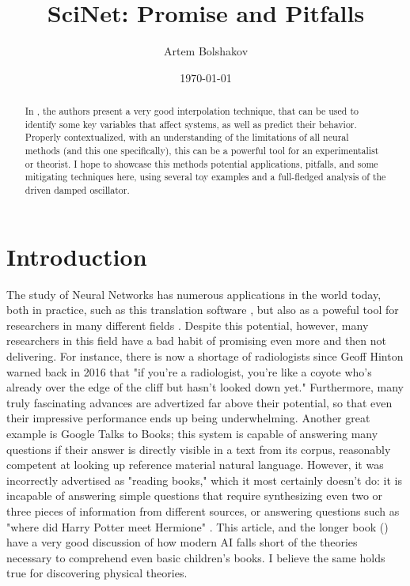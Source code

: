 \documentclass[aps,prl,preprint,groupedaddress]{revtex4-1}
\begin{document}
\title{SciNet: Promise and Pitfalls}

\author{Artem Bolshakov}

\date{\today}

\begin{abstract}
In \cite{iten2020}, the authors present a very good interpolation technique, that can be used to identify some key variables that affect systems, as well as predict their behavior. Properly contextualized, with an understanding of the limitations of all neural methods (and this one specifically), this can be a powerful tool for an experimentalist or theorist. I hope to showcase this methods potential applications, pitfalls, and some mitigating techniques here, using several toy examples and a full-fledged analysis of the driven damped oscillator.
\end{abstract}

\maketitle

\section{Introduction}

The study of Neural Networks has numerous applications in the world today, both in practice, such as this translation software \cite{attention}, but also as a poweful tool for researchers in many different fields \cite{deeplabcut}. Despite this potential, however, many researchers in this field have a bad habit of promising even more and then not delivering. For instance, there is now a shortage of radiologists since Geoff Hinton warned back in 2016 that "if you're a radiologist, you're like a coyote who's already over the edge of the cliff but hasn't looked down yet." Furthermore, many truly fascinating advances are advertized far above their potential, so that even their impressive performance ends up being underwhelming. Another great example is Google Talks to Books; this system is capable of answering many questions if their answer is directly visible in a text from its corpus, reasonably competent at looking up reference material natural language. However, it was incorrectly advertised as "reading books," which it most certainly doesn't do: it is incapable of answering simple questions that require synthesizing even two or three pieces of information from different sources, or answering questions such as "where did Harry Potter meet Hermione" \cite{gmarticle}. This article, and the longer book (\cite{gmbook}) have a very good discussion of how modern AI falls short of the theories necessary to comprehend even basic children's books. I believe the same holds true for discovering physical theories.
\end{document}

